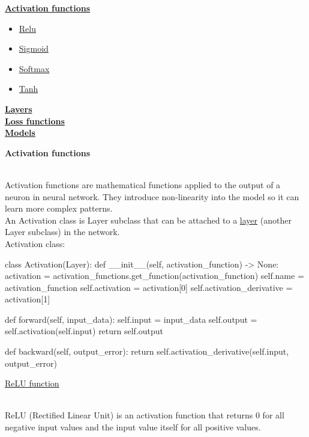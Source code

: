 \documentclass{article}
\begin{document}
    \hyperlink{activation_functions}{\textbf{Activation functions}}
    \begin{itemize}
        \item \hyperlink{relu}{Relu}
        \item \hyperlink{sigmoid}{Sigmoid}
        \item \hyperlink{softmax}{Softmax}
        \item \hyperlink{tanh}{Tanh}
    \end{itemize}

    \hyperlink{layers}{\textbf{Layers}} \\
    \hyperlink{losses}{\textbf{Loss functions}} \\
    \hyperlink{models}{\textbf{Models}} \\
    \clearpage

    \hypertarget{activation_functions}{\textbf{Activation functions}} \\

    Activation functions are mathematical functions applied to
    the output of a neuron in neural network. They introduce non-linearity into 
    the model so it can learn more complex patterns. \\

    An Activation class is Layer subclass that can be attached to a \hyperlink{layers}{\underline{layer}} 
    (another Layer subclass) in the network. \\

    Activation class:
    \begin{python}
class Activation(Layer):
    def __init__(self, activation_function) -> None:
        activation = activation_functions.get_function(activation_function)
        self.name = activation_function
        self.activation = activation[0]
        self.activation_derivative = activation[1]

    def forward(self, input_data):
        self.input = input_data
        self.output = self.activation(self.input)
        return self.output

    def backward(self, output_error):
        return self.activation_derivative(self.input, output_error)
    \end{python}
    \pagebreak

    \hypertarget{relu}{\underline{ReLU function}} \\
    
    ReLU (Rectified Linear Unit) is an activation function that returns 0 for all 
    negative input values and the input value itself for all 
    positive values. \\
\end{document}
